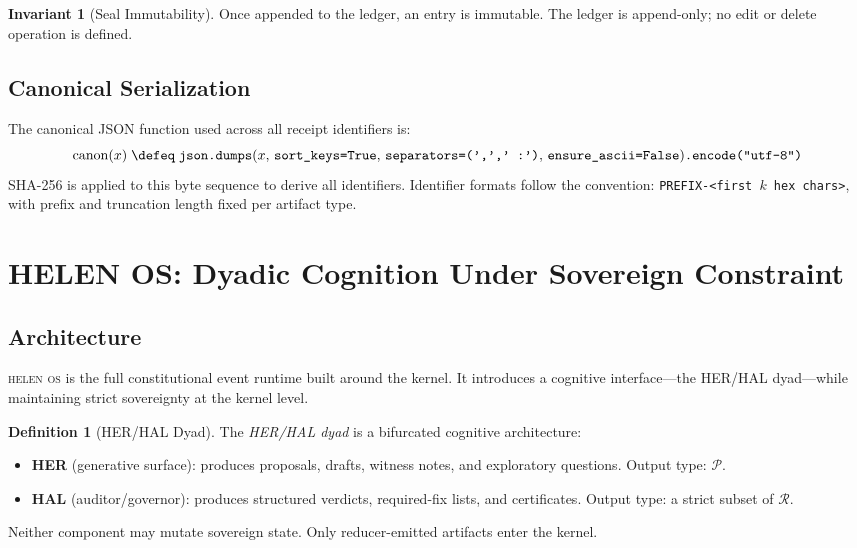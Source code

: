 \documentclass[11pt,a4paper]{article}
\theoremstyle{plain}
\theoremstyle{definition}
\newtheorem{definition}[theorem]{Definition}
\newtheorem{invariant}[theorem]{Invariant}
\theoremstyle{remark}
\newcommand{\Prop}{\mathcal{P}}
\newcommand{\Rec}{\mathcal{R}}
\begin{document}
\begin{invariant}[Seal Immutability]
\label{inv:immutability}
Once appended to the ledger, an entry is immutable.
The ledger is append-only; no edit or delete operation is defined.
\end{invariant}

\subsection{Canonical Serialization}

The canonical JSON function used across all receipt identifiers is:
\[
  \mathrm{canon}(x) \;\defeq\;
  \texttt{json.dumps}(x,\, \texttt{sort\_keys=True},\,
  \texttt{separators=(',',' :')},\, \texttt{ensure\_ascii=False})
  \texttt{.encode("utf-8")}
\]
SHA-256 is applied to this byte sequence to derive all identifiers.
Identifier formats follow the convention:
\texttt{PREFIX-<first $k$ hex chars>},
with prefix and truncation length fixed per artifact type.

\section{HELEN OS: Dyadic Cognition Under Sovereign Constraint}
\label{sec:helen}

\subsection{Architecture}

\textsc{helen os} is the full constitutional event runtime built around the kernel.
It introduces a cognitive interface---the HER/HAL dyad---while maintaining
strict sovereignty at the kernel level.

\begin{definition}[HER/HAL Dyad]
\label{def:dyad}
The \emph{HER/HAL dyad} is a bifurcated cognitive architecture:
\begin{itemize}[nosep]
  \item \textbf{HER} (generative surface): produces proposals, drafts,
        witness notes, and exploratory questions. Output type:
        $\Prop$.
  \item \textbf{HAL} (auditor/governor): produces structured verdicts,
        required-fix lists, and certificates. Output type:
        a strict subset of $\Rec$.
\end{itemize}
Neither component may mutate sovereign state.
Only reducer-emitted artifacts enter the kernel.
\end{definition}
\end{document}
